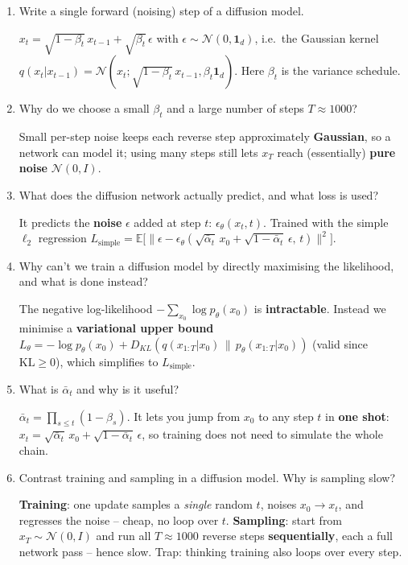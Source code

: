 \documentclass[10pt,a4paper]{article}
\newcommand{\q}[1]{\item #1}
\begin{document}
\begin{enumerate}[leftmargin=*,label=\textbf{Q\arabic*.}]
\q Write a single forward (noising) step of a diffusion model.
\begin{answerbox}
$x_t=\sqrt{1-\beta_t}\,x_{t-1}+\sqrt{\beta_t}\,\epsilon$ with $\epsilon\sim\mathcal{N}(0,\mathbf{1}_d)$, i.e.\ the Gaussian kernel $q(x_t|x_{t-1})=\mathcal{N}(x_t;\sqrt{1-\beta_t}\,x_{t-1},\beta_t\mathbf{1}_d)$. Here $\beta_t$ is the variance schedule.
\end{answerbox}

\q Why do we choose a small $\beta_t$ and a large number of steps $T\approx1000$?
\begin{answerbox}
Small per-step noise keeps each reverse step approximately \textbf{Gaussian}, so a network can model it; using many steps still lets $x_T$ reach (essentially) \textbf{pure noise} $\mathcal{N}(0,I)$.
\end{answerbox}

\q What does the diffusion network actually predict, and what loss is used?
\begin{answerbox}
It predicts the \textbf{noise} $\epsilon$ added at step $t$: $\epsilon_\theta(x_t,t)$. Trained with the simple $\ell_2$ regression $L_{\text{simple}}=\mathbb{E}\big[\|\epsilon-\epsilon_\theta(\sqrt{\bar\alpha_t}\,x_0+\sqrt{1-\bar\alpha_t}\,\epsilon,\,t)\|^2\big]$.
\end{answerbox}

\q Why can't we train a diffusion model by directly maximising the likelihood, and what is done instead?
\begin{answerbox}
The negative log-likelihood $-\sum_{x_0}\log p_\theta(x_0)$ is \textbf{intractable}. Instead we minimise a \textbf{variational upper bound} $L_\theta=-\log p_\theta(x_0)+D_{KL}(q(x_{1:T}|x_0)\,\|\,p_\theta(x_{1:T}|x_0))$ (valid since $\text{KL}\ge0$), which simplifies to $L_{\text{simple}}$.
\end{answerbox}

\q What is $\bar\alpha_t$ and why is it useful?
\begin{answerbox}
$\bar\alpha_t=\prod_{s\le t}(1-\beta_s)$. It lets you jump from $x_0$ to any step $t$ in \textbf{one shot}: $x_t=\sqrt{\bar\alpha_t}\,x_0+\sqrt{1-\bar\alpha_t}\,\epsilon$, so training does not need to simulate the whole chain.
\end{answerbox}

\q Contrast training and sampling in a diffusion model. Why is sampling slow?
\begin{answerbox}
\textbf{Training}: one update samples a \emph{single} random $t$, noises $x_0\to x_t$, and regresses the noise -- cheap, no loop over $t$. \textbf{Sampling}: start from $x_T\sim\mathcal{N}(0,I)$ and run all $T\approx1000$ reverse steps \textbf{sequentially}, each a full network pass -- hence slow. Trap: thinking training also loops over every step.
\end{answerbox}


\end{enumerate}
\end{document}
